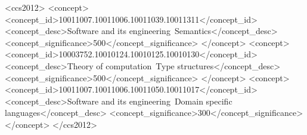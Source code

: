 \documentclass[sigplan,screen]{acmart}
\begin{document}
\begin{CCSXML}
<ccs2012>
<concept>
<concept_id>10011007.10011006.10011039.10011311</concept_id>
<concept_desc>Software and its engineering~Semantics</concept_desc>
<concept_significance>500</concept_significance>
</concept>
<concept>
<concept_id>10003752.10010124.10010125.10010130</concept_id>
<concept_desc>Theory of computation~Type structures</concept_desc>
<concept_significance>500</concept_significance>
</concept>
<concept>
<concept_id>10011007.10011006.10011050.10011017</concept_id>
<concept_desc>Software and its engineering~Domain specific languages</concept_desc>
<concept_significance>300</concept_significance>
</concept>
</ccs2012>
\end{CCSXML}


\maketitle              %

\thispagestyle{empty}










%
%
%



\end{document}
